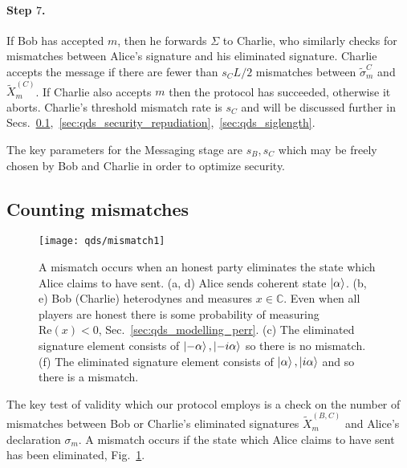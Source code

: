 \paragraph{Step $7$.} If Bob has accepted $m$, then he forwards $\Sigma$ to Charlie, who similarly checks for mismatches between Alice's signature and his eliminated signature. Charlie accepts the message if %
there are fewer than $s_C L/2$  mismatches between $\tilde{\sigma}_m^C$ and $\tilde{X}_m^{\left(C\right)}$. If Charlie also accepts $m$ then the protocol has succeeded, otherwise it aborts.  Charlie's threshold mismatch rate is $s_C$ and will be discussed further in Secs.~\ref{sec:qds_mismatches},~\ref{sec:qds_security_repudiation},~\ref{sec:qds_siglength}.

The key parameters for the Messaging stage are $s_B, s_C$ which may be freely chosen by Bob and Charlie in order to optimize security.

\subsection{Counting mismatches}\label{sec:qds_mismatches}

\begin{figure}[htp]
\centering
\texttt{[image: qds/mismatch1]}
\caption{\label{fig:qds_mismatches} A mismatch occurs when an honest party eliminates the state which Alice claims to have sent. (a, d) Alice sends coherent state $\ket{\alpha}$. (b, e) Bob (Charlie) heterodynes and measures $x \in \mathbb{C}$. Even when all players are honest there is some probability of measuring $\text{Re}\left(x\right) < 0$, Sec.~\ref{sec:qds_modelling_perr}. (c) The eliminated signature element consists of $\ket{- \alpha}, \ket{- i \alpha}$ so there is no mismatch. (f) The eliminated signature element consists of $\ket{\alpha}, \ket{i \alpha}$ and so there is a mismatch.}
\end{figure}


The key test of validity which our protocol employs is a check on the number of mismatches between Bob or Charlie's eliminated signatures $\tilde{X}^{\left(B, C\right)}_m$ and Alice's declaration $\sigma_m$. A mismatch occurs if the state which Alice claims to have sent has been eliminated, Fig.~\ref{fig:qds_mismatches}. 

